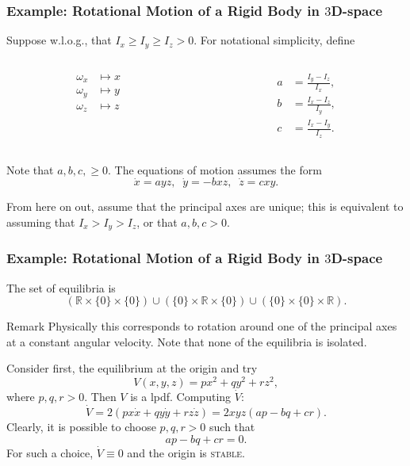 \begin{frame}
    \frametitle{Example: Rotational Motion of a Rigid Body in $3$D-space}

    Suppose w.l.o.g., that $I_x \geq I_y \geq I_z > 0$. For notational
    simplicity, define
    \begin{columns}
        \begin{column}{0.5\textwidth}
            \begin{align*}
                \omega_x &\mapsto x \\
                \omega_y &\mapsto y \\
                \omega_z &\mapsto z
            \end{align*}
        \end{column}
        \begin{column}{0.5\textwidth}
            \begin{align*}
                a &= \frac{I_y - I_z}{I_x}, \\
                b &= \frac{I_x - I_z}{I_y}, \\
                c &= \frac{I_x - I_y}{I_z}.
            \end{align*}
        \end{column}
    \end{columns}
    Note that $a, b, c, \geq 0$. The equations of motion assumes the form
    \[ \dot{x} = ayz, \;\; \dot{y} = -bxz, \;\; \dot{z} = cxy. \]

    From here on out, assume that the principal axes are unique; this is
    equivalent to assuming that $I_x > I_y > I_z$, or that $a, b, c > 0$.
\end{frame}

\begin{frame}
    \frametitle{Example: Rotational Motion of a Rigid Body in $3$D-space}

    The set of equilibria is \[ \left( \mathbb{R} \times \{0\} \times \{0\}
    \right) \cup \left( \{0\} \times \mathbb{R} \times \{0\} \right) \cup
    \left( \{0\} \times \{0\} \times \mathbb{R} \right). \] \vspace{-4mm}
    \begin{block}{Remark}
        Physically this corresponds to rotation around one of the principal axes
        at a constant angular velocity. Note that none of the equilibria is
        isolated.
    \end{block}
    \vspace{-2mm}
    Consider first, the equilibrium at the origin and try \[ V(x,y,z) = px^2 +
    qy^2 + rz^2, \] where $p,q,r > 0$. Then $V$ is a lpdf. Computing $\dot{V}$:
    \[ \dot{V} = 2(px\dot{x} + qy\dot{y} + rz\dot{z}) = 2xyz(ap - bq + cr). \]
    Clearly, it is possible to choose $p,q,r > 0$ such that \[ ap - bq + cr = 0.
    \] For such a choice, $\dot{V} \equiv 0$ and the origin is \textsc{stable}.
\end{frame}



